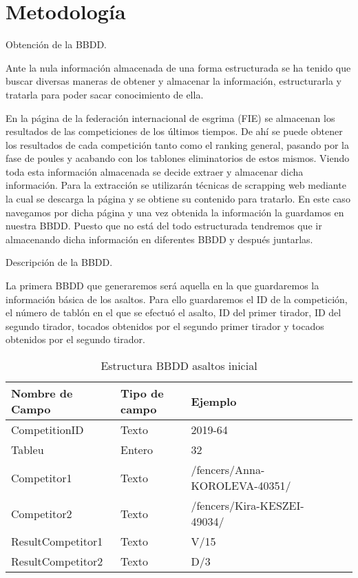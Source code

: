 \chapter{Metodología}
\label{cap:Metodologia}

Obtención de la BBDD.

Ante la nula información almacenada de una forma estructurada se ha tenido que buscar
 diversas maneras de obtener y almacenar la información, estructurarla y tratarla para
 poder sacar conocimiento de ella.

En la página de la federación internacional de esgrima (FIE) se almacenan los resultados
 de las competiciones de los últimos tiempos. De ahí se puede obtener los resultados
 de cada competición tanto como el ranking general, pasando por la fase de poules
 y acabando con los tablones eliminatorios de estos mismos. Viendo toda esta información
 almacenada se decide extraer y almacenar dicha información. Para la extracción se
 utilizarán técnicas de scrapping web mediante la cual se descarga la página y se
 obtiene su contenido para tratarlo. En este caso navegamos por dicha página y una
 vez obtenida la información la guardamos en nuestra BBDD. Puesto que no está del
 todo estructurada tendremos que ir almacenando dicha información en diferentes BBDD
 y después juntarlas.

Descripción de la BBDD.

La primera BBDD que generaremos será aquella en la que guardaremos la información
 básica de los asaltos. Para ello guardaremos el ID de la competición, el número
 de tablón en el que se efectuó el asalto, ID del primer tirador, ID del segundo
 tirador, tocados obtenidos por el segundo primer tirador y tocados obtenidos por
 el segundo tirador.

\begin{table}[htb]%
  \centering
  \caption{Estructura BBDD asaltos inicial}
  \label{tab:anchura}
  \begin{tabular}{ | l | l | l | l | l | l | }
    \hline
    Nombre de Campo & Tipo de campo & Ejemplo \\ \hline
    CompetitionID & Texto & 2019-64 \\ \hline
    Tableu & Entero & 32 \\ \hline
    Competitor1 & Texto & /fencers/Anna-KOROLEVA-40351/ \\ \hline
    Competitor2 & Texto & /fencers/Kira-KESZEI-49034/ \\ \hline
    ResultCompetitor1 & Texto & V/15 \\ \hline
    ResultCompetitor2 & Texto & D/3 \\
    \hline
  \end{tabular}
\end{table}

